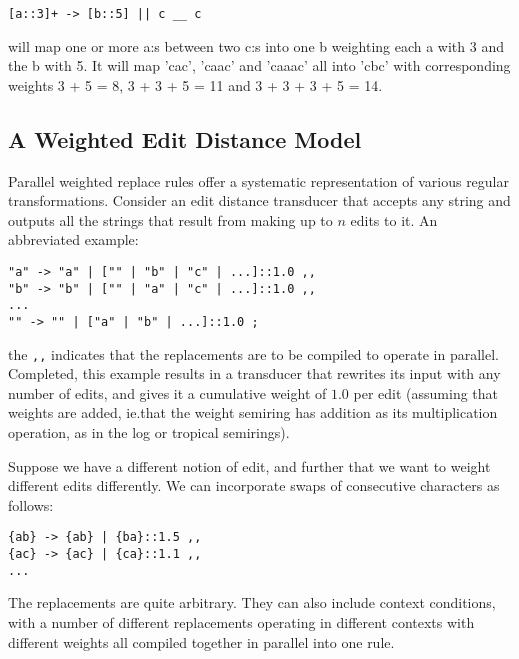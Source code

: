 \documentclass{llncs}
\begin{document}
\begin{framed}
\begin{verbatim}
[a::3]+ -> [b::5] || c __ c
\end{verbatim}
\end{framed}

will map one or more a:s between two c:s into one b weighting each a with 3
and the b with 5. It will map 'cac', 'caac' and 'caaac' all into 'cbc' with
corresponding weights 3 + 5 = 8, 3 + 3 + 5 = 11 and 3 + 3 + 3 + 5 = 14.

\subsection{A Weighted Edit Distance Model}

Parallel weighted replace rules offer a systematic representation of various
regular transformations. Consider an edit distance transducer that accepts
any string and outputs all the strings that result from making up to $n$ edits
to it. An abbreviated example:

\begin{framed}
\begin{verbatim}
"a" -> "a" | ["" | "b" | "c" | ...]::1.0 ,,
"b" -> "b" | ["" | "a" | "c" | ...]::1.0 ,,
...
"" -> "" | ["a" | "b" | ...]::1.0 ;
\end{verbatim}
\end{framed}

the \verb+,,+ indicates that the replacements are to be compiled to operate
in parallel. Completed, this example results in a transducer that rewrites
its input with any number of edits, and gives it a cumulative weight of
$1.0$ per edit (assuming that weights are added, ie.\@ that the weight semiring
has addition as its multiplication operation, as in the log or tropical
semirings).

Suppose we have a different notion of edit, and further that we want to weight
different edits differently. We can incorporate swaps of consecutive
characters as follows:

\begin{framed}
\begin{verbatim}
{ab} -> {ab} | {ba}::1.5 ,,
{ac} -> {ac} | {ca}::1.1 ,,
... 
\end{verbatim}
\end{framed}

The replacements are quite arbitrary. They can also include context conditions,
with a number of different replacements operating in different contexts with
different weights all compiled together in parallel into one rule.
\end{document}
